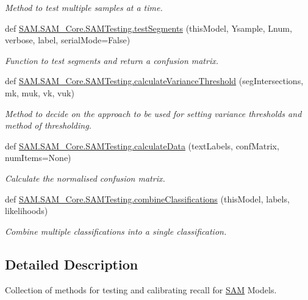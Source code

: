 \begin{DoxyCompactItemize}
\begin{DoxyCompactList}\small\item\em Method to test multiple samples at a time. \end{DoxyCompactList}\item 
def \hyperlink{group__icubclient__SAM__Tests_gab4468c0fd3358f455f808f6e4a4132ea}{S\+A\+M.\+S\+A\+M\+\_\+\+Core.\+S\+A\+M\+Testing.\+test\+Segments} (this\+Model, Ysample, Lnum, verbose, label, serial\+Mode=False)
\begin{DoxyCompactList}\small\item\em Function to test segments and return a confusion matrix. \end{DoxyCompactList}\item 
def \hyperlink{group__icubclient__SAM__Tests_gad2632767e0112bb1762614591096bd95}{S\+A\+M.\+S\+A\+M\+\_\+\+Core.\+S\+A\+M\+Testing.\+calculate\+Variance\+Threshold} (seg\+Intersections, mk, muk, vk, vuk)
\begin{DoxyCompactList}\small\item\em Method to decide on the approach to be used for setting variance thresholds and method of thresholding. \end{DoxyCompactList}\item 
def \hyperlink{group__icubclient__SAM__Tests_ga7ae6c28b9d56e28c26cd320b8d321ff6}{S\+A\+M.\+S\+A\+M\+\_\+\+Core.\+S\+A\+M\+Testing.\+calculate\+Data} (text\+Labels, conf\+Matrix, num\+Items=None)
\begin{DoxyCompactList}\small\item\em Calculate the normalised confusion matrix. \end{DoxyCompactList}\item 
def \hyperlink{group__icubclient__SAM__Tests_ga2475129eb5c2e30ffe652729e98b3fc5}{S\+A\+M.\+S\+A\+M\+\_\+\+Core.\+S\+A\+M\+Testing.\+combine\+Classifications} (this\+Model, labels, likelihoods)
\begin{DoxyCompactList}\small\item\em Combine multiple classifications into a single classification. \end{DoxyCompactList}\end{DoxyCompactItemize}


\subsection{Detailed Description}
Collection of methods for testing and calibrating recall for \hyperlink{namespaceSAM}{S\+AM} Models. 



